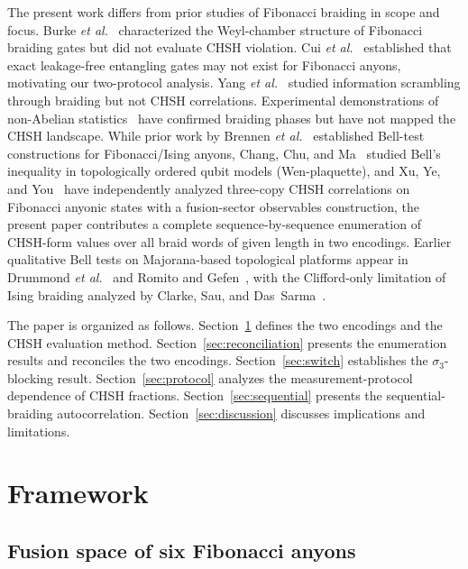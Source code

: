 \documentclass[aps,pra,twocolumn,superscriptaddress,longbibliography,floatfix,nofootinbib]{revtex4-2}
\begin{document}
The present work differs from prior studies of Fibonacci braiding
in scope and focus.
Burke \emph{et al.}~\cite{Burke2024} characterized the Weyl-chamber
structure of Fibonacci braiding gates but did not evaluate
CHSH violation.
Cui \emph{et al.}~\cite{Cui2019} established that exact
leakage-free entangling gates may not exist for Fibonacci anyons,
motivating our two-protocol analysis.
Yang \emph{et al.}~\cite{Yang2019} studied information scrambling
through braiding but not CHSH correlations.
Experimental demonstrations of non-Abelian
statistics~\cite{Google2023} have confirmed braiding phases
but have not mapped the CHSH landscape.
While prior work by Brennen \emph{et al.}~\cite{Brennen2009} established Bell-test
constructions for Fibonacci/Ising anyons, Chang, Chu, and
Ma~\cite{ChangChuMa2017} studied Bell's inequality in topologically
ordered qubit models (Wen-plaquette), and Xu, Ye, and
You~\cite{Xu2025} have independently analyzed
three-copy CHSH correlations on Fibonacci anyonic states with a
fusion-sector observables construction, the present paper contributes a
complete sequence-by-sequence enumeration of CHSH-form values over all
braid words of given length in two encodings.
Earlier qualitative Bell tests on Majorana-based
topological platforms appear in Drummond \emph{et al.}~\cite{Drummond2014}
and Romito and Gefen~\cite{RomitoGefen2017}, with the Clifford-only
limitation of Ising braiding analyzed by Clarke, Sau, and
Das~Sarma~\cite{ClarkeSauDasSarma2016}.

The paper is organized as follows.
Section~\ref{sec:framework} defines the two encodings and
the CHSH evaluation method.
Section~\ref{sec:reconciliation} presents the enumeration
results and reconciles the two encodings.
Section~\ref{sec:switch} establishes the $\sigma_3$-blocking result.
Section~\ref{sec:protocol} analyzes the measurement-protocol
dependence of CHSH fractions.
Section~\ref{sec:sequential} presents the sequential-braiding
autocorrelation.
Section~\ref{sec:discussion} discusses implications and limitations.

\section{Framework}
\label{sec:framework}

\subsection{Fusion space of six Fibonacci anyons}
\end{document}
